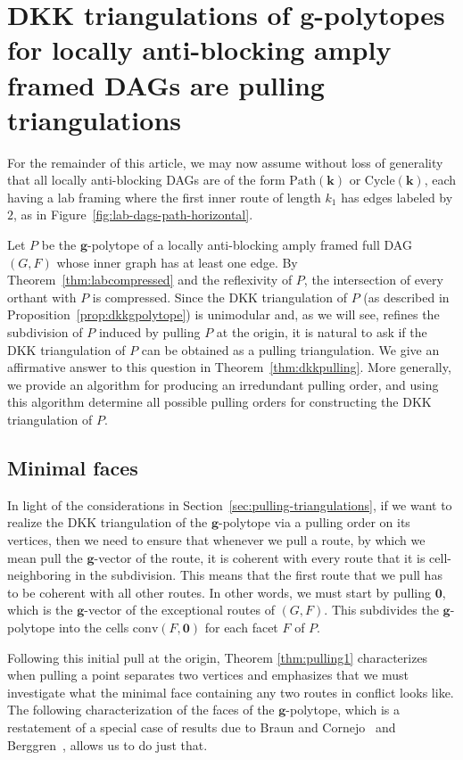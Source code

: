 \documentclass[12pt]{amsart}
\theoremstyle{definition}
\newcommand\bg{\mathbf{g}}
\newcommand\bk{\mathbf{k}}
\newcommand\bzero{\mathbf{0}}
\newcommand\conv{\mathrm{conv}}
\newcommand\Path{\mathrm{Path}}
\newcommand\Cycle{\mathrm{Cycle}}
\begin{document}
\section{DKK triangulations of \texorpdfstring{$\bg$}{g}-polytopes for locally anti-blocking amply framed DAGs are pulling triangulations}\label{sec:pulling}

For the remainder of this article, we may now assume without loss of generality that all locally anti-blocking DAGs are of the form $\Path(\bk)$ or $\Cycle(\bk)$, each having a lab framing where the first inner route of length $k_1$ has edges labeled by $2$, as in Figure~\ref{fig:lab-dags-path-horizontal}.



Let $P$ be the $\bg$-polytope of a locally anti-blocking amply framed full DAG $(G,F)$ whose inner graph has at least one edge.
By Theorem~\ref{thm:labcompressed} and the reflexivity of $P$, the intersection of every orthant with $P$ is compressed.
Since the DKK triangulation of $P$ (as described in Proposition~\ref{prop:dkkgpolytope}) is unimodular and, as we will see, refines the subdivision of $P$ induced by pulling $P$ at the origin, it is natural to ask if the DKK triangulation of $P$ can be obtained as a pulling triangulation.
We give an affirmative answer to this question in Theorem~\ref{thm:dkkpulling}.
More generally, we provide an algorithm for producing an irredundant pulling order, and using this algorithm determine all possible pulling orders for constructing the DKK triangulation of $P$.


\subsection{Minimal faces}\label{sec:minimalfaces}

In light of the considerations in Section~\ref{sec:pulling-triangulations}, if we want to realize the DKK triangulation of the $\bg$-polytope via a pulling order on its vertices, then we need to ensure that whenever we pull a route, by which we mean pull the $\bg$-vector of the route, it is coherent with every route that it is cell-neighboring in the subdivision.
This means that the first route that we pull has to be coherent with all other routes.
In other words, we must start by pulling $\bzero$, which is the $\bg$-vector of the exceptional routes of $(G,F)$.
This subdivides the $\bg$-polytope into the cells $\conv(F,\bzero)$ for each facet $F$ of $P$.

Following this initial pull at the origin, Theorem \ref{thm:pulling1}  characterizes when pulling a point separates two vertices and emphasizes that we must investigate what the minimal face containing any two routes in conflict looks like.
The following characterization of the faces of the $\bg$-polytope, which is a restatement of a special case of results due to Braun and Cornejo~\cite[Theorem 4.6]{BraunCornejo} and Berggren~\cite{Berggren}, allows us to do just that.
\end{document}
